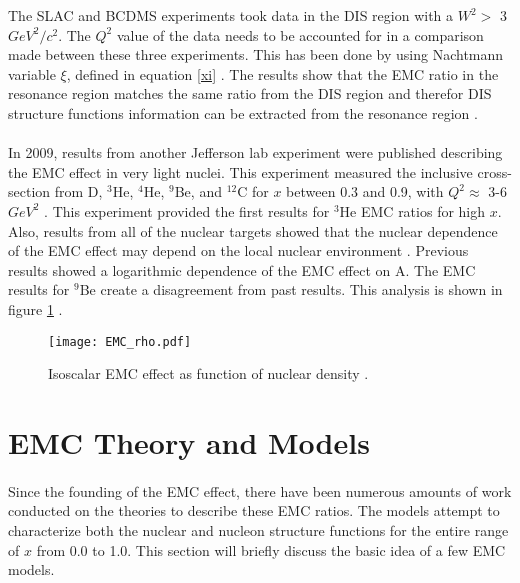 The SLAC and BCDMS experiments took data in the DIS region with a $W^2 > $ 3 $GeV^2/c^2$. The $Q^2$ value of the data needs to be accounted for in a comparison made between these three experiments. This has been done by using Nachtmann variable $\xi$, defined in equation \ref{xi} \cite{EMC_JA}. The results show that the EMC ratio in the resonance region matches the same ratio from the DIS region and therefor DIS structure functions information can be extracted from the resonance region \cite{seelyth}. 
\paragraph{}In 2009, results from another Jefferson lab experiment were published describing the EMC effect in very light nuclei. This experiment measured the inclusive cross-section from D, $^3$He, $^4$He, $^9$Be, and $^{12}$C for $x$ between 0.3 and 0.9, with $Q^2 \approx$ 3-6 $GeV^2$ \cite{seeley}.  This experiment provided the first results for $^3$He EMC ratios for high $x$.  Also, results from all of the nuclear targets showed that the nuclear dependence of the EMC effect may depend on the local nuclear environment \cite{seeley}. Previous results showed a logarithmic dependence of the EMC effect on A. The EMC results for $^9$Be create a disagreement from past results. This analysis is shown in figure \ref{EMCrho} \cite{seeley}.

\iffalse
\begin{figure}[h]
	\centering
	\texttt{[image: He3\_EMC\_seely.pdf]} 
	\caption{EMC ratio for He3, Blue points are corrected for proton excess\cite{seeley}.}
	\label{EMCHe3_Seely}
\end{figure} 
\fi

\begin{figure}[h]
	\centering
	\texttt{[image: EMC\_rho.pdf]} 
	\caption{Isoscalar EMC effect as function of nuclear density \cite{seeley}.}
	\label{EMCrho}
\end{figure} 

\section{EMC Theory and Models}
\paragraph{}Since the founding of the EMC effect, there have been numerous amounts of work conducted on the theories to describe these EMC ratios. The models attempt to characterize both the nuclear and nucleon structure functions for the entire range of $x$ from 0.0 to 1.0. This section will briefly discuss the basic idea of a few EMC models.
